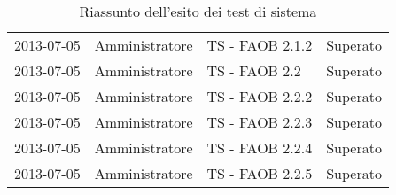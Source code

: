 {{\begin{table}[h!]
\begin{center}
\begin{tabular}{c l l c}
					2013-07-05 & Amministratore & TS - FAOB 2.1.2 & Superato\\
					2013-07-05 & Amministratore & TS - FAOB 2.2 & Superato\\
					2013-07-05 & Amministratore & TS - FAOB 2.2.2 & Superato\\
					2013-07-05 & Amministratore & TS - FAOB 2.2.3 & Superato\\
					2013-07-05 & Amministratore & TS - FAOB 2.2.4 & Superato\\
					2013-07-05 & Amministratore & TS - FAOB 2.2.5 & Superato\\										
					\bottomrule
				\end{tabular}
			\end{center}	
			\caption{Riassunto dell'esito dei test di sistema} 
		\end{table}
	}

	
}